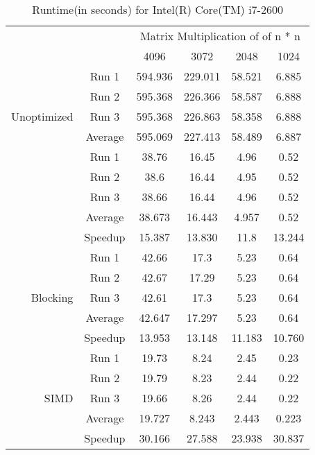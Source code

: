 \documentclass{article}
\begin{document}
\begin{table}[H]
\centering
\begin{tabular}{rc|c|c|c|c|}
\multicolumn{2}{r}{}
 &  \multicolumn{4}{c}{Matrix Multiplication of of n * n} \\
\cline{3-6}
& & 4096 & 3072 & 2048 & 1024 \\
\cline{1-6}
\multirow{5}{*}{Unoptimized} & \multicolumn{1}{|c|}{Run 1}  & 594.936 & 229.011 & 58.521 & 6.885 \\
\cline{2-6}
& \multicolumn{1}{|c|}{Run 2} & 595.368 & 226.366  & 58.587 & 6.888\\
\cline{2-6}
& \multicolumn{1}{|c|}{Run 3}  & 595.368 & 226.863 &  58.358  &  6.888\\
\cline{2-6}
& \multicolumn{1}{|c|}{Average}  & 595.069 & 227.413 &  58.489 & 6.887\\
\cline{1-6}
\multirow{5}{*}{Reordered} & \multicolumn{1}{|c|}{Run 1}  & 38.76 & 16.45 & 4.96 & 0.52\\
\cline{2-6}
& \multicolumn{1}{|c|}{Run 2} & 38.6 & 16.44  & 4.95 & 0.52 \\
\cline{2-6}
& \multicolumn{1}{|c|}{Run 3}  & 38.66 & 16.44 & 4.96 & 0.52\\
\cline{2-6}
& \multicolumn{1}{|c|}{Average}  & 38.673 &  16.443 & 4.957 & 0.52\\
\cline{2-6}
& \multicolumn{1}{|c|}{Speedup}  & 15.387 &  13.830 & 11.8 & 13.244 \\
\cline{1-6}
\multirow{5}{*}{Blocking} & \multicolumn{1}{|c|}{Run 1}  & 42.66 & 17.3 & 5.23 & 0.64 \\
\cline{2-6}
& \multicolumn{1}{|c|}{Run 2} & 42.67 & 17.29 & 5.23 & 0.64 \\
\cline{2-6}
& \multicolumn{1}{|c|}{Run 3}  & 42.61 &  17.3 & 5.23 & 0.64 \\
\cline{2-6}
& \multicolumn{1}{|c|}{Average}  & 42.647 &  17.297 & 5.23 & 0.64 \\
\cline{2-6}
& \multicolumn{1}{|c|}{Speedup}  & 13.953 &  13.148 & 11.183 & 10.760 \\
\cline{1-6}
\multirow{5}{*}{SIMD} & \multicolumn{1}{|c|}{Run 1}  & 19.73 &  8.24 & 2.45 & 0.23  \\
\cline{2-6}
& \multicolumn{1}{|c|}{Run 2} & 19.79 &  8.23 & 2.44 & 0.22 \\
\cline{2-6}
& \multicolumn{1}{|c|}{Run 3}  & 19.66 &  8.26 & 2.44 & 0.22 \\
\cline{2-6}
& \multicolumn{1}{|c|}{Average}  & 19.727 &  8.243 & 2.443 & 0.223 \\
\cline{2-6}
& \multicolumn{1}{|c|}{Speedup}  & 30.166 &  27.588 & 23.938 & 30.837 \\
\cline{1-6}

\end{tabular}
 \caption{Runtime(in seconds) for Intel(R) Core(TM) i7-2600}
 \label{tab:i7speed}
\end{table}
\end{document}
